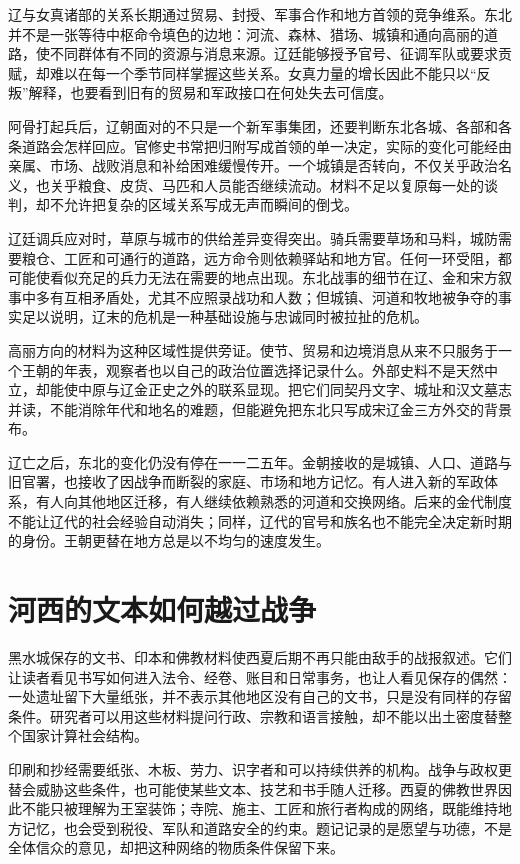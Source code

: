辽与女真诸部的关系长期通过贸易、封授、军事合作和地方首领的竞争维系。东北并不是一张等待中枢命令填色的边地：河流、森林、猎场、城镇和通向高丽的道路，使不同群体有不同的资源与消息来源。辽廷能够授予官号、征调军队或要求贡赋，却难以在每一个季节同样掌握这些关系。女真力量的增长因此不能只以“反叛”解释，也要看到旧有的贸易和军政接口在何处失去可信度。

阿骨打起兵后，辽朝面对的不只是一个新军事集团，还要判断东北各城、各部和各条道路会怎样回应。官修史书常把归附写成首领的单一决定，实际的变化可能经由亲属、市场、战败消息和补给困难缓慢传开。一个城镇是否转向，不仅关乎政治名义，也关乎粮食、皮货、马匹和人员能否继续流动。材料不足以复原每一处的谈判，却不允许把复杂的区域关系写成无声而瞬间的倒戈。

辽廷调兵应对时，草原与城市的供给差异变得突出。骑兵需要草场和马料，城防需要粮仓、工匠和可通行的道路，远方命令则依赖驿站和地方官。任何一环受阻，都可能使看似充足的兵力无法在需要的地点出现。东北战事的细节在辽、金和宋方叙事中多有互相矛盾处，尤其不应照录战功和人数；但城镇、河道和牧地被争夺的事实足以说明，辽末的危机是一种基础设施与忠诚同时被拉扯的危机。

高丽方向的材料为这种区域性提供旁证。使节、贸易和边境消息从来不只服务于一个王朝的年表，观察者也以自己的政治位置选择记录什么。外部史料不是天然中立，却能使中原与辽金正史之外的联系显现。把它们同契丹文字、城址和汉文墓志并读，不能消除年代和地名的难题，但能避免把东北只写成宋辽金三方外交的背景布。

辽亡之后，东北的变化仍没有停在一一二五年。金朝接收的是城镇、人口、道路与旧官署，也接收了因战争而断裂的家庭、市场和地方记忆。有人进入新的军政体系，有人向其他地区迁移，有人继续依赖熟悉的河道和交换网络。后来的金代制度不能让辽代的社会经验自动消失；同样，辽代的官号和族名也不能完全决定新时期的身份。王朝更替在地方总是以不均匀的速度发生。

\section{河西的文本如何越过战争}

黑水城保存的文书、印本和佛教材料使西夏后期不再只能由敌手的战报叙述。它们让读者看见书写如何进入法令、经卷、账目和日常事务，也让人看见保存的偶然：一处遗址留下大量纸张，并不表示其他地区没有自己的文书，只是没有同样的存留条件。研究者可以用这些材料提问行政、宗教和语言接触，却不能以出土密度替整个国家计算社会结构。

印刷和抄经需要纸张、木板、劳力、识字者和可以持续供养的机构。战争与政权更替会威胁这些条件，也可能使某些文本、技艺和书手随人迁移。西夏的佛教世界因此不能只被理解为王室装饰；寺院、施主、工匠和旅行者构成的网络，既能维持地方记忆，也会受到税役、军队和道路安全的约束。题记记录的是愿望与功德，不是全体信众的意见，却把这种网络的物质条件保留下来。

